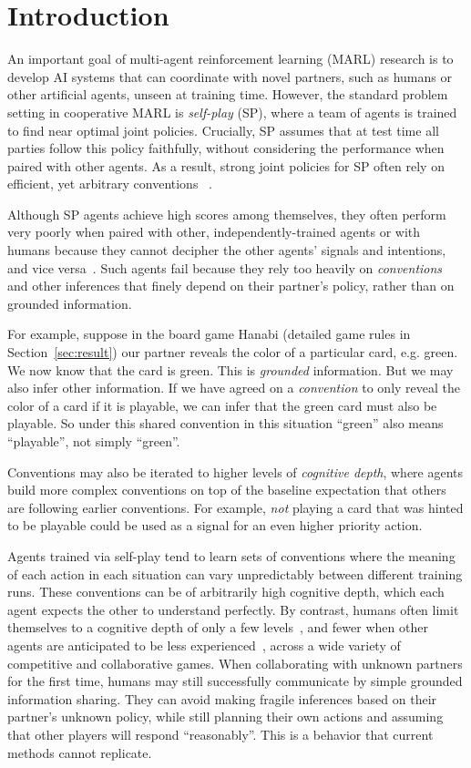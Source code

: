 \section{Introduction}
\label{sec:intro}


An important goal of multi-agent reinforcement learning (MARL) research is to develop AI systems that can coordinate with novel partners, such as humans or other artificial agents, unseen at training time.
However, the standard problem setting in cooperative MARL is \emph{self-play} (SP), where a team of agents is trained to find near optimal joint policies. Crucially, SP assumes that at test time all parties follow this policy faithfully, without considering the performance when paired with other agents.
As a result, strong joint policies for SP often rely on efficient, yet arbitrary conventions
~\cite{foerster2019bayesian}.


Although SP agents achieve high scores among themselves, they often perform very poorly when paired with other, independently-trained agents or with humans because they cannot decipher the other agents' signals and intentions, and vice versa~\cite{carroll2019utility, bard2020hanabi, hu2020other}. Such agents fail because they rely too heavily on \emph{conventions} and other inferences that finely depend on their partner's policy, rather than on grounded information.

For example, suppose in the board game Hanabi (detailed game rules in Section~\ref{sec:result}) our partner reveals the color of a particular card, e.g. green. We now know that the card is green. This is \emph{grounded} information. But we may also infer other information. If we have agreed on a \emph{convention} to only reveal the color of a card if it is playable, we can infer that the green card must also be playable. So under this shared convention in this situation ``green'' also means ``playable'', not simply ``green''.  

Conventions may also be iterated to higher levels of \emph{cognitive depth}, where agents build more complex conventions on top of the baseline expectation that others are following earlier conventions.
For example, \emph{not} playing a card that was hinted to be playable could be used as a signal for an even higher priority action.


Agents trained via self-play tend to learn sets of conventions where the meaning of each action in each situation can vary unpredictably between different training runs. These conventions can be of arbitrarily high cognitive depth, which each agent expects the other to understand perfectly. 
By contrast, humans often limit themselves to a cognitive depth of only a few levels~\cite{camerer2003}, and fewer when other agents are anticipated to be less experienced~\cite{agranov2012449}, across a wide variety of competitive and collaborative games. When collaborating with unknown partners for the first time, humans may still successfully communicate by simple grounded information sharing. They can avoid making fragile inferences based on their partner's unknown policy, while still planning their own actions and assuming that other players will respond ``reasonably''. This is a behavior that current methods cannot replicate. 

